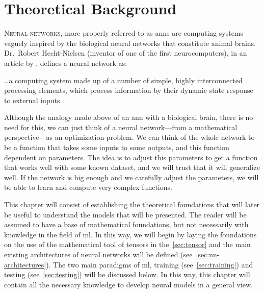 

\chapter{Theoretical Background}\label{cha:theory}



\lettrine{N}{eural networks}, more properly referred to
as \glspl{ann} are computing systems vaguely inspired by the biological neural
networks that constitute animal brains. Dr.\ Robert Hecht-Nielsen (inventor of
one of the first neurocomputers), in an article by
, defines a neural network as:

\begin{quoteBox}
  \ldots a computing system made up of a number of simple, highly
  interconnected processing elements, which process information by their
  dynamic state response to external inputs.
  \tcblower{}
\end{quoteBox}

Although the analogy made above of an \gls{ann} with a biological brain, there
is no need for this, we can just think of a neural network---from a
mathematical perspective---as an optimization problem. We can think of the
whole network to be a function that takes some inputs to some outputs, and this
function dependent on parameters. The idea is to adjust this parameters to get
a function that works well with some known dataset, and we will trust that it
will generalize well. If the network is big enough and we carefully adjust the
parameters, we will be able to learn and compute very complex functions.

This chapter will consist of establishing the theoretical foundations that will
later be useful to understand the models that will be presented. The reader
will be assumed to have a base of mathematical foundations, but not necessarily
with knowledge in the field of \gls{ml}. In this way, we will begin by laying
the foundations on the use of the mathematical tool of tensors in the\
\vref{sec:tensor} and the main existing architectures of neural networks will
be defined (see\ \vref{sec:nn-architectures}). The two main paradigms of
\gls{ml}, training (see\ \vref{sec:training}) and testing (see\
\vref{sec:testing}) will be discussed below. In this way, this chapter will
contain all the necessary knowledge to develop neural models in a general
view.


